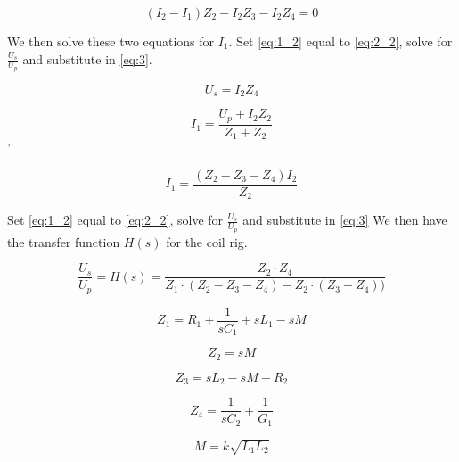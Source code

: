 \begin{equation} \label{eq:2}
    (I_2 - I_1) Z_2 - I_2 Z_3 - I_2 Z_4 = 0
\end{equation}

We then solve these two equations for $I_1$. Set \cref{eq:1_2} equal to \cref{eq:2_2}, solve for $\frac{U_s}{U_p}$ and substitute in \cref{eq:3}.

\begin{equation} \label{eq:3}
    U_s = I_2 Z_4
\end{equation}

\begin{equation} \label{eq:1_2}
    I_1 = \frac{U_p + I_2 Z_2}{Z_1 + Z_2}
\end{equation}'

\begin{equation} \label{eq:2_2}
    I_1 = \frac{(Z_2 - Z_3 - Z_4) I_2}{Z_2}
\end{equation}

Set \cref{eq:1_2} equal to \cref{eq:2_2}, solve for $\frac{U_s}{U_p}$ and substitute in \cref{eq:3}  We then have the transfer function $H(s)$ for the coil rig.

\begin{equation} \label{eq:4}
    \frac{U_s}{U_p} = H(s) = \frac{Z_2 \cdot Z_4}{Z_1 \cdot (Z_2 - Z_3 - Z_4) - Z_2 \cdot (Z_3 + Z_4))}
\end{equation}

\begin{equation} \label{eq:4_1}
    Z_1 = R_1 + \frac{1}{s C_1} + s L_1 - s M
\end{equation}

\begin{equation} \label{eq:4_2}
    Z_2 = s M
\end{equation}

\begin{equation} \label{eq:4_3}
    Z_3 = s L_2 - s M + R_2
\end{equation}

\begin{equation} \label{eq:4_4}
    Z_4 = \frac{1}{s C_2} + \frac{1}{G_1}
\end{equation}

\begin{equation} \label{eq:4_5}
    M = k \sqrt{L_1 L_2}
\end{equation}


